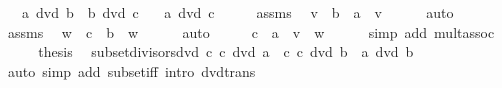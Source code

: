 \begin{isabellebody}
\ \ \ {\isachardoublequoteopen}a\ dvd\ b{\isachardoublequoteclose}\ \ {\isachardoublequoteopen}b\ dvd\ c{\isachardoublequoteclose}\isanewline
\ \ \ {\isachardoublequoteopen}a\ dvd\ c{\isachardoublequoteclose}\isanewline
%
\isadelimproof
%
\endisadelimproof
%
\isatagproof
{}\isamarkupfalse%
\ {\isacharminus}{\kern0pt}\isanewline
\ \ \isamarkupfalse%
\ assms\ \isamarkupfalse%
\ v\ \ {\isachardoublequoteopen}b\ {\isacharequal}{\kern0pt}\ a\ {\isacharasterisk}{\kern0pt}\ v{\isachardoublequoteclose}\isanewline
\ \ \ \ \isamarkupfalse%
\ auto\isanewline
\ \ \isamarkupfalse%
\ \isamarkupfalse%
\ assms\ \isamarkupfalse%
\ w\ \ {\isachardoublequoteopen}c\ {\isacharequal}{\kern0pt}\ b\ {\isacharasterisk}{\kern0pt}\ w{\isachardoublequoteclose}\isanewline
\ \ \ \ \isamarkupfalse%
\ auto\isanewline
\ \ \isamarkupfalse%
\ \isamarkupfalse%
\ {\isachardoublequoteopen}c\ {\isacharequal}{\kern0pt}\ a\ {\isacharasterisk}{\kern0pt}\ {\isacharparenleft}{\kern0pt}v\ {\isacharasterisk}{\kern0pt}\ w{\isacharparenright}{\kern0pt}{\isachardoublequoteclose}\isanewline
\ \ \ \ \isamarkupfalse%
\ {\isacharparenleft}{\kern0pt}simp\ add{\isacharcolon}{\kern0pt}\ mult{\isachardot}{\kern0pt}assoc{\isacharparenright}{\kern0pt}\isanewline
\ \ \isamarkupfalse%
\ \isamarkupfalse%
\ {\isacharquery}{\kern0pt}thesis\ \isacommand{{\isachardot}{\kern0pt}{\isachardot}{\kern0pt}}\isamarkupfalse%
\isanewline
{}\isamarkupfalse%
%
\endisatagproof
{\isafoldproof}%
%
\isadelimproof
\isanewline
%
\endisadelimproof
\isanewline
{}\isamarkupfalse%
\ subset{\isacharunderscore}{\kern0pt}divisors{\isacharunderscore}{\kern0pt}dvd{\isacharcolon}{\kern0pt}\ {\isachardoublequoteopen}{\isacharbraceleft}{\kern0pt}c{\isachardot}{\kern0pt}\ c\ dvd\ a{\isacharbraceright}{\kern0pt}\ {\isasymsubseteq}\ {\isacharbraceleft}{\kern0pt}c{\isachardot}{\kern0pt}\ c\ dvd\ b{\isacharbraceright}{\kern0pt}\ {\isasymlongleftrightarrow}\ a\ dvd\ b{\isachardoublequoteclose}\isanewline
%
\isadelimproof
\ \ %
\endisadelimproof
%
\isatagproof
{}\isamarkupfalse%
\ {\isacharparenleft}{\kern0pt}auto\ simp\ add{\isacharcolon}{\kern0pt}\ subset{\isacharunderscore}{\kern0pt}iff\ intro{\isacharcolon}{\kern0pt}\ dvd{\isacharunderscore}{\kern0pt}trans{\isacharparenright}{\kern0pt}%
\endisatagproof

\end{isabellebody}
